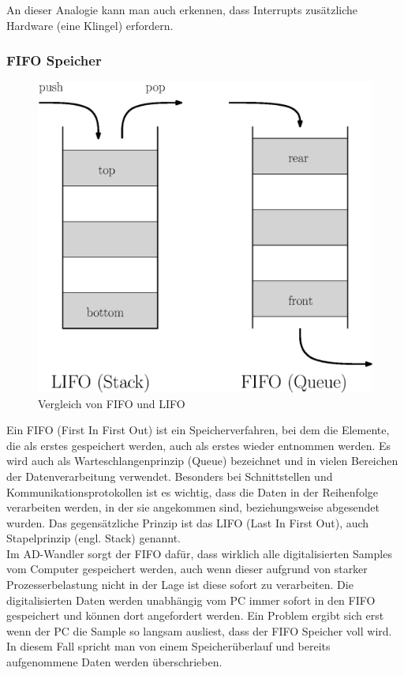 \documentclass[12pt,a4paper]{scrartcl}
\begin{document}
An dieser Analogie kann man auch erkennen, dass Interrupts zusätzliche Hardware (eine Klingel) erfordern.


\subsubsection{FIFO Speicher}

\begin{figure}[H]
\centering
\includegraphics[scale=.7]{fifolifo.eps}
\caption{Vergleich von FIFO und LIFO}
\label{fifolifo}
\end{figure}

Ein FIFO (First In First Out) ist ein Speicherverfahren, bei dem die Elemente, die als erstes gespeichert werden, auch als erstes wieder entnommen werden. Es wird auch als Warteschlangenprinzip (Queue) bezeichnet und in vielen Bereichen der Datenverarbeitung verwendet. Besonders bei Schnittstellen und Kommunikationsprotokollen ist es wichtig, dass die Daten in der Reihenfolge verarbeiten werden, in der sie angekommen sind, beziehungsweise abgesendet wurden. Das gegensätzliche Prinzip ist das LIFO (Last In First Out), auch Stapelprinzip (engl. Stack) genannt.\\

Im AD-Wandler sorgt der FIFO dafür, dass wirklich alle digitalisierten Samples vom Computer gespeichert werden, auch wenn dieser aufgrund von starker Prozesserbelastung nicht in der Lage ist diese sofort zu verarbeiten. Die digitalisierten Daten werden unabhängig vom PC immer sofort in den FIFO gespeichert und können dort angefordert werden. Ein Problem ergibt sich erst wenn der PC die Sample so langsam ausliest, dass der FIFO Speicher voll wird. In diesem Fall spricht man von einem Speicherüberlauf und bereits aufgenommene Daten werden überschrieben.\\
\end{document}
